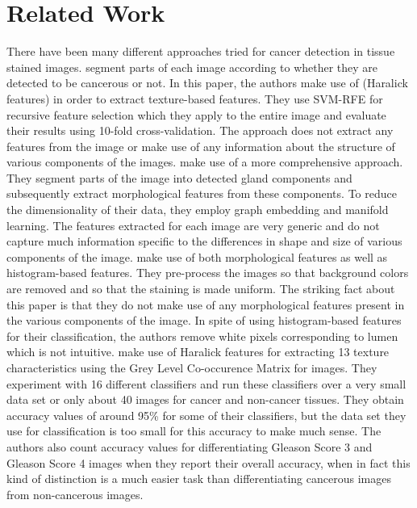 \section{Related Work}
There have been many different approaches tried for cancer detection in tissue stained images. \cite{automatic} segment parts of each image according to whether they are detected to be cancerous or not. In this paper, the authors make use of (Haralick features) in order to extract texture-based features. They use SVM-RFE for recursive feature selection which they apply to the entire image and evaluate their results using 10-fold cross-validation. The approach does not extract any features from the image or make use of any information about the structure of various components of the images. 
\cite{naik2007gland} make use of a more comprehensive approach. They segment parts of the image into detected gland components and subsequently extract morphological features from these components. To reduce the dimensionality of their data, they employ graph embedding and manifold learning. The features extracted for each image are very generic and do not capture much information specific to the differences in shape and size of various components of the image.
\cite{tabesh2007multifeature} make use of both morphological features as well as histogram-based features. They pre-process the images so that background colors are removed and so that the staining is made uniform. The striking fact about this paper is that they do not make use of any morphological features present in the various components of the image. In spite of using histogram-based features for their classification, the authors remove white pixels corresponding to lumen which is not intuitive. 
\cite{alexandratou2010evaluation} make use of Haralick features for extracting 13 texture characteristics using the Grey Level Co-occurence Matrix for images. They experiment with 16 different classifiers and run these classifiers over a very small data set or only about 40 images for cancer and non-cancer tissues. They obtain accuracy values of around 95\% for some of their classifiers, but the data set they use for classification is too small for this accuracy to make much sense.
The authors also count accuracy values for differentiating Gleason Score 3 and Gleason Score 4 images when they report their overall accuracy, when in fact this kind of distinction is a much easier task than differentiating cancerous images from non-cancerous images.
